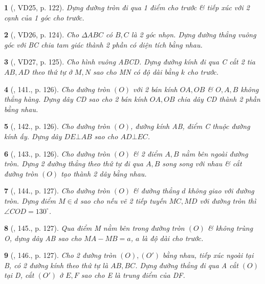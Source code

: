 \documentclass{article}
\newtheorem{baitoan}{}
\begin{document}
\begin{baitoan}[\cite{Binh_Toan_9_tap_1}, VD25, p. 122]
	Dựng đường tròn đi qua 1 điểm cho trước \& tiếp xúc với 2 cạnh của 1 góc cho trước.
\end{baitoan}

\begin{baitoan}[\cite{Binh_Toan_9_tap_1}, VD26, p. 124]
	Cho $\Delta ABC$ có $B,C$ là 2 góc nhọn. Dựng đường thẳng vuông góc với BC chia tam giác thành 2 phần có diện tích bằng nhau.
\end{baitoan}

\begin{baitoan}[\cite{Binh_Toan_9_tap_1}, VD27, p. 125]
	Cho hình vuông ABCD. Dựng đường kính đi qua C cắt 2 tia $AB,AD$ theo thứ tự ở $M,N$ sao cho MN có độ dài bằng $k$ cho trước.
\end{baitoan}

\begin{baitoan}[\cite{Binh_Toan_9_tap_1}, 141., p. 126]
	Cho đường tròn $(O)$ với 2 bán kính $OA,OB$ \& $O,A,B$ không thẳng hàng. Dựng dây CD sao cho 2 bán kính $OA,OB$ chia dây CD thành 2 phần bằng nhau.
\end{baitoan}

\begin{baitoan}[\cite{Binh_Toan_9_tap_1}, 142., p. 126]
	Cho đường tròn $(O)$, đường kính AB, điểm C thuộc đường kính ấy. Dựng dây $DE\bot AB$ sao cho $AD\bot EC$.
\end{baitoan}

\begin{baitoan}[\cite{Binh_Toan_9_tap_1}, 143., p. 126]
	Cho đường tròn $(O)$ \& 2 điểm $A,B$ nằm bên ngoài đường tròn. Dựng 2 đường thẳng theo thứ tự đi qua $A,B$ song song với nhau \& cắt đường tròn $(O)$ tạo thành 2 dây bằng nhau.
\end{baitoan}

\begin{baitoan}[\cite{Binh_Toan_9_tap_1}, 144., p. 127]
	Cho đường tròn $(O)$ \& đường thẳng $d$ không giao với đường tròn. Dựng điểm $M\in d$ sao cho nếu vẽ 2 tiếp tuyến $MC,MD$ với đường tròn thì $\angle{COD} = 130^\circ$.
\end{baitoan}

\begin{baitoan}[\cite{Binh_Toan_9_tap_1}, 145., p. 127]
	Qua điểm M nằm bên trong đường tròn $(O)$ \& không trùng O, dựng dây AB sao cho $MA - MB = a$, $a$ là độ dài cho trước.
\end{baitoan}

\begin{baitoan}[\cite{Binh_Toan_9_tap_1}, 146., p. 127]
	Cho 2 đường tròn $(O),(O')$ bằng nhau, tiếp xúc ngoài tại B, có 2 đường kính theo thứ tự là $AB,BC$. Dựng đường thẳng đi qua A cắt $(O)$ tại D, cắt $(O')$ ở $E,F$ sao cho E là trung điểm của DF.
\end{baitoan}
\end{document}
